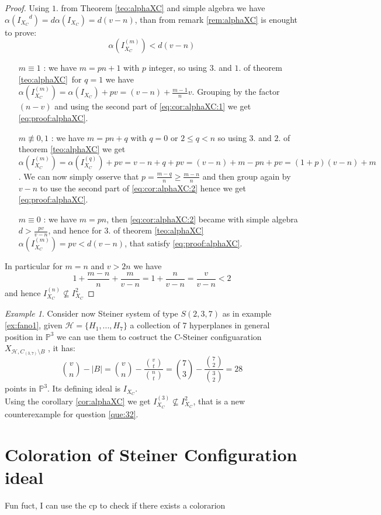 \documentclass[]{book}
\theoremstyle{plain}
\theoremstyle{remark}
\newtheorem{ex}[rem]{Example}
\theoremstyle{definition}
\newcommand{\PP}{\mathbb{P}}
\newcommand{\HH}{\mathcal{H}}
\DeclareMathOperator*{\eqb }{=}
\begin{document}
 \begin{proof}
 Using $ 1. $ from Theorem \ref{teo:alphaXC} and simple algebra we have $ \alpha({I_{X_C}}^d) = d\alpha(I_{X_C}) = d(v- n) $, than from remark \ref{rem:alphaXC} is enought to prove:
 \begin{equation}\label{eq:proof:alphaXC}
 \alpha(I_{X_C}^{(m)}) < d(v-n)
 \end{equation}
 \begin{itemize}
 \item[$m \equiv 1$ : ] we have $ m = pn + 1 $ with $ p $ integer, so using $ 3. $ and $ 1. $ of theorem \ref{teo:alphaXC} for $ q = 1 $ we have $  \alpha(I_{X_C}^{(m)}) \eqb \alpha(I_{X_C} ) + pv \eqb (v-n) + \frac{m-1}{n}v  $. Grouping by the factor $ (n-v) $ and using the second part of \ref{eq:cor:alphaXC:1} we get \ref{eq:proof:alphaXC}. 
 \item[$m \not\equiv 0,1$ : ] we have $ m = pn + q $ with $ q = 0 $ or $ 2 \leq q < n $ so using $ 3. $ and $ 2. $ of theorem \ref{teo:alphaXC} we get  $  \alpha(I_{X_C}^{(m)}) \eqb \alpha(I_{X_C}^{(q)} ) + pv \eqb v - n + q  +pv = (v - n) + m -pn +pv = (1 + p)(v - n) + m $. We can now simply osserve that $ p = \frac{m-q}{n} \geq \frac{m-n}{n} $ and then group again by $ v-n $ to use the second part of \ref{eq:cor:alphaXC:2} hence we get \ref{eq:proof:alphaXC}.
 \item[$ m\equiv 0 $ : ] we have $ m=pn $, then \ref{eq:cor:alphaXC:2} became with simple algebra $ d > \frac{pv}{v-n} $, and hence for $ 3. $ of theorem \ref{teo:alphaXC} $  \alpha(I_{X_C}^{(m)})= pv < d(v-n)$, that satisfy \ref{eq:proof:alphaXC}. 
 \end{itemize}
 In particular for $ m=n $ and $ v > 2n $ we have 
 \[ 1 +\frac{ m - n }{ n } + \frac{ m }{ v - n } = 1 + \frac{ n }{ v - n }= \frac{ v }{ v - n } < 2 \]
 and hence $ I_{X_C}^{(n)} \not \subseteq I_{X_C}^2  $
 \end{proof}
 
 \begin{ex}\label{ex:fano2}
 Consider now Steiner system of type $ S(2,3,7) $ as in example \ref{ex:fano1}, given $ \HH = \{ H_1 , ... , H_7 \} $ a collection of 7 hyperplanes in general position in $ \PP^3 $ we can use them to costruct the C-Steiner configuaration $ X_{\HH , C_{(3,7)} \setminus B} $ , it has:
 \[
 \binom{v}{n} - |B| = \binom{v}{n} -  \frac{\binom{v}{t}}{\binom{n}{t}} = \binom{7}{3} -  \frac{\binom{7}{2}}{\binom{3}{2}} = 28
 \]
 points in $ \PP^3 $. Its defining ideal is  $ I_{X_C} $. \\
 Using the corollary \ref{cor:alphaXC} we get $ I_{X_C}^{(3)}  \not \subseteq I_{X_C}^2$, that is a new counterexample for question \ref{que:32}. 
 
 
 \end{ex}
 

\chapter{Coloration of Steiner Configuration ideal}
Fun fuct, I can use the cp to check if there exists a colorarion


\backmatter
\printbibliography
\end{document}
